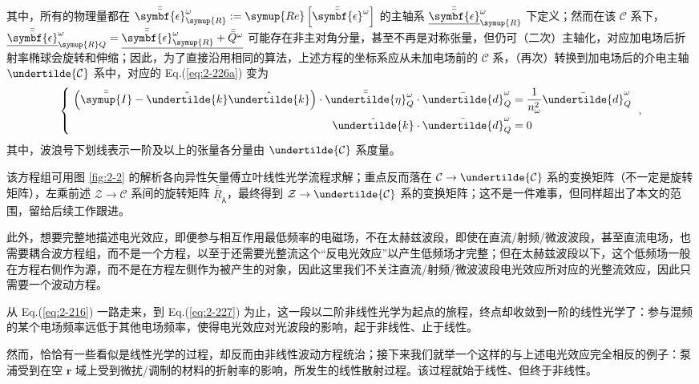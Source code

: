 其中，所有的物理量都在 $\bar{\bar{\symbf{\epsilon}}}_{\symup{R}}^{\omega} := \symup{Re} \left[ \bar{\bar{\symbf{\epsilon}}}^{\omega} \right]$ 的主轴系 $\bar{\bar{\underline{\symbf{\epsilon}}}}_{\symup{R}}^{\omega}$ 下定义；然而在该 $\mathcal C$ 系下，$\bar{\bar{\underline{\symbf{\epsilon}}}}_{\symup{R}Q}^{\omega} = \underline{\bar{\bar{\symbf{\epsilon}}}_{\symup{R}}^{\omega} + {\bar{\bar{Q}}^{\omega}}}$ 可能存在非主对角分量，甚至不再是对称张量，但仍可（二次）主轴化，对应加电场后折射率椭球会旋转和伸缩；因此，为了直接沿用相同的算法，上述方程的坐标系应从未加电场前的 $\mathcal C$ 系，（再次）转换到加电场后的介电主轴 $\undertilde{\mathcal C}$ 系中，对应的 Eq.(\ref{eq:2-226a}) 变为
\begin{equation} \label{eq:2-227}
	\left\{\ \begin{aligned} \left( \bar{\bar{\symup{I}}} - \hat{\undertilde{k}} \hat{\undertilde{k}} \right) \cdot \bar{\bar{\undertilde{\eta}}}^{\omega}_Q \cdot \bar{\undertilde{d}}^{\omega}_Q &= \frac{ 1 }{ n^2_\omega } \bar{\undertilde{d}}^{\omega}_Q \\ \hat{\undertilde{k}} \cdot \bar{\undertilde{d}}^{\omega}_Q &= 0 \end{aligned}\right. ~,
\end{equation}
其中，波浪号下划线表示一阶及以上的张量各分量由 $\undertilde{\mathcal C}$ 系度量。

该方程组可用图 \ref{fig:2-2} 的解析各向异性矢量傅立叶线性光学流程求解；重点反而落在 $\mathcal C \rightarrow \undertilde{\mathcal C}$ 系的变换矩阵（不一定是旋转矩阵），左乘前述 $\mathcal Z \rightarrow \mathcal C$ 系间的旋转矩阵 $\bar{\bar{\underline{R}}}_{\Yup}$，最终得到 $\mathcal Z \rightarrow \undertilde{\mathcal C}$ 系的变换矩阵；这不是一件难事，但同样超出了本文的范围，留给后续工作跟进。

此外，想要完整地描述电光效应，即便参与相互作用最低频率的电磁场，不在太赫兹波段，即使在直流/射频/微波波段，甚至直流电场，也需要耦合波方程组，而不是一个方程，以至于还需要光整流这个“反电光效应”以产生低频场\cite{ShiFeiXianXingGuangXue2012}才完整；但在太赫兹波段以下，这个低频场一般在方程右侧作为源，而不是在方程左侧作为被产生的对象，因此这里我们不关注直流/射频/微波波段电光效应所对应的光整流效应，因此只需要一个波动方程。

从 Eq.(\ref{eq:2-216}) 一路走来，到 Eq.(\ref{eq:2-227}) 为止，这一段以二阶非线性光学为起点的旅程，终点却收敛到一阶的线性光学了：参与混频的某个电场频率远低于其他电场频率，使得电光效应对光波段的影响，起于非线性、止于线性。

然而，恰恰有一些看似是线性光学的过程，却反而由非线性波动方程统治；接下来我们就举一个这样的与上述电光效应完全相反的例子：泵浦受到在空 $\symbf{r}$ 域上受到微扰/调制的材料的折射率的影响，所发生的线性散射过程。该过程就始于线性、但终于非线性。

